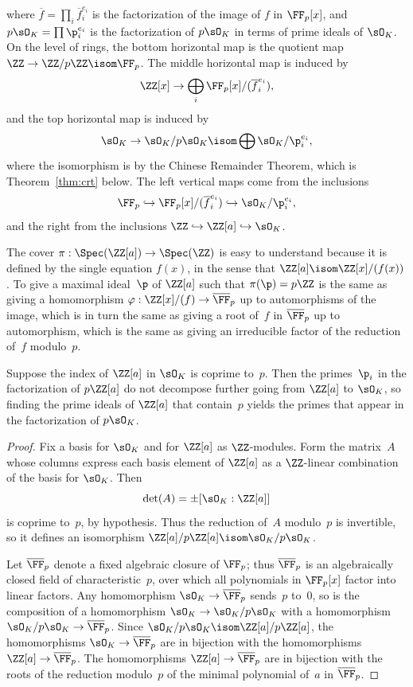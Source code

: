 where $\overline{f} = \prod_i \overline{f}_i^{e_i}$ is the factorization of the
image of $f$ in $\FF_p[x]$, and $p\sO_K = \prod \p_i^{e_i}$ is the factorization
of $p\sO_K$ in terms of prime ideals of $\sO_K$. On the level of rings, the
bottom horizontal map is the quotient map $\ZZ\to\ZZ/p\ZZ\isom \FF_p$.
The middle horizontal map is induced by
$$
  \ZZ[x] \to \bigoplus_i \FF_p[x]/(\overline{f}_i^{e_i}),
$$
and the top horizontal map is induced by
$$
  \sO_K \to \sO_K/p\sO_K \isom \bigoplus \sO_K/\p_i^{e_i},
$$
where the isomorphism is by the Chinese Remainder Theorem,
which is Theorem~\ref{thm:crt} below.
The left vertical maps come from the inclusions
$$
   \FF_p \hookrightarrow \FF_p[x]/(\overline{f}_i^{e_i}) \hookrightarrow \sO_K/\p_i^{e_i},
$$
and the right from the inclusions $\ZZ \hookrightarrow \ZZ[a] \hookrightarrow \sO_K$.

The cover $\pi:\Spec(\ZZ[a]) \rightarrow \Spec(\ZZ)$ is easy to understand because it is
defined by the single equation $f(x)$,
in the sense that $\ZZ[a] \isom \ZZ[x]/(f(x))$.
To give a maximal ideal~$\p$ of $\ZZ[a]$ such that $\pi(\p) = p\ZZ$ is the same
as giving a homomorphism $\varphi: \ZZ[x]/(f) \rightarrow \overline{\FF}_p$ up to automorphisms of
the image, which is in turn the same as giving a root of~$f$ in $\overline{\FF}_p$ up
to automorphism, which is the same as giving an irreducible factor of the
reduction of~$f$ modulo~$p$.

\begin{lemma}\label{lem:factpok}
  Suppose the index of $\ZZ[a]$ in $\sO_K$ is coprime to~$p$.
  Then the primes~$\p_i$ in the factorization of $p\ZZ[a]$ do not
  decompose further going from $\ZZ[a]$ to $\sO_K$, so finding the
  prime ideals of $\ZZ[a]$ that contain~$p$ yields the primes
  that appear in the factorization of $p\sO_K$.
\end{lemma}
\begin{proof}
  Fix a basis for $\sO_K$ and for $\ZZ[a]$ as $\ZZ$-modules.
  Form the matrix~$A$ whose columns express each basis element
  of $\ZZ[a]$ as a $\ZZ$-linear combination of the basis for $\sO_K$.
  Then
  $$
    \det(A) = \pm [\sO_K:\ZZ[a]]
  $$
  is coprime to~$p$, by hypothesis. Thus the reduction of~$A$
  modulo~$p$ is invertible, so it defines an isomorphism
  $\ZZ[a]/p\ZZ[a] \isom \sO_K/p\sO_K$.

  Let $\overline{\FF}_p$ denote a fixed algebraic closure of $\FF_p$; thus $\overline{\FF}_p$
  is an algebraically closed field of characteristic~$p$, over which
  all polynomials in $\FF_p[x]$ factor into linear factors.
  Any homomorphism $\sO_K\to \overline{\FF}_p$ sends~$p$ to~$0$, so is the composition
  of a homomorphism $\sO_K \to \sO_K/p\sO_K$ with a homomorphism
  $\sO_K/p\sO_K \to \overline{\FF}_p$. Since $\sO_K/p\sO_K \isom \ZZ[a]/p\ZZ[a]$, the
  homomorphisms $\sO_K\to \overline{\FF}_p$ are in bijection with the homomorphisms
  $\ZZ[a]\to \overline{\FF}_p$. The homomorphisms $\ZZ[a]\to\overline{\FF}_p$ are in bijection
  with the roots of the reduction modulo~$p$ of the minimal polynomial
  of~$a$ in $\overline{\FF}_p$.
\end{proof}

